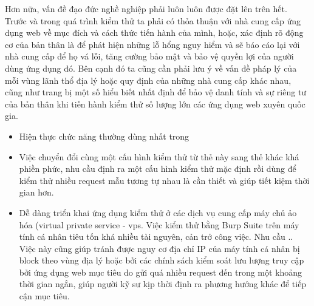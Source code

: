 Hơn nữa, vấn đề đạo đức nghề nghiệp phải luôn luôn được đặt lên trên hết. Trước và trong quá trình kiểm thử ta phải có thỏa thuận với nhà cung cấp ứng dụng web về mục đích và cách thức tiến hành của mình, hoặc, xác định rõ động cơ của bản thân là để phát hiện những lỗ hổng nguy hiểm và sẽ báo cáo lại với nhà cung cấp để họ vá lỗi, tăng cường bảo mật và bảo vệ quyền lợi của người dùng ứng dụng đó. Bên cạnh đó ta cũng cần phải lưu ý về vấn đề pháp lý của mỗi vùng lãnh thổ địa lý hoặc quy định của những nhà cung cấp khác nhau, cũng như trang bị một số hiểu biết nhất định để bảo vệ danh tính và sự riêng tư của bản thân khi tiến hành kiểm thử số lượng lớn các ứng dụng web xuyên quốc gia.\par

\begin{itemize}
    \item Hiện thực chức năng thường dùng nhất trong 
    \item Việc chuyển đổi cùng một cấu hình kiểm thử từ thẻ này sang thẻ khác khá phiền phức, nhu cầu định ra một cấu hình kiểm thử mặc định rồi dùng để kiểm thử nhiều request mẫu tương tự nhau là cần thiết và giúp tiết kiệm thời gian hơn.
    \item Dễ dàng triển khai ứng dụng kiểm thử ở các dịch vụ cung cấp máy chủ ảo hóa (virtual private service - \acrshort{vps}. Việc kiểm thử bằng Burp Suite trên máy tính cá nhân tiêu tốn khá nhiều tài nguyên, cản trở công việc. Nhu cầu .. Việc này cũng giúp tránh được nguy cơ địa chỉ IP của máy tính cá nhân bị block theo vùng địa lý hoặc bởi các chính sách kiểm soát lưu lượng truy cập bởi ứng dụng web mục tiêu do gửi quá nhiều request đến trong một khoảng thời gian ngắn, giúp người kỹ sư kịp thời định ra phương hướng khác để tiếp cận mục tiêu.
\end{itemize}


